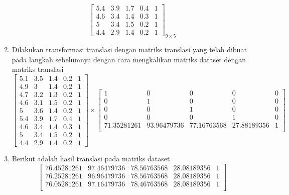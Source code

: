 \begin{enumerate}
\[\begin{bmatrix}
            5.4		&		3.9		&		1.7		&		0.4		&		1 \\
            4.6		&		3.4		&		1.4		&		0.3		&		1 \\
            5		&		3.4		&		1.5		&		0.2		&		1 \\
            4.4		&		2.9		&		1.4		&		0.2		&		1
        \end{bmatrix}_{9\times 5}
    \]
    \item Dilakukan transformasi translasi dengan matriks translasi yang telah dibuat pada langkah sebelumnya dengan cara mengkalikan matriks dataset dengan matriks translasi
    \[
        \begin{bmatrix}
            5.1		&		3.5		&		1.4		&		0.2		&		1 \\
            4.9		&		3		&		1.4		&		0.2		&		1 \\
            4.7		&		3.2		&		1.3		&		0.2		&		1 \\
            4.6		&		3.1		&		1.5		&		0.2		&		1 \\
            5		&		3.6		&		1.4		&		0.2		&		1 \\
            5.4		&		3.9		&		1.7		&		0.4		&		1 \\
            4.6		&		3.4		&		1.4		&		0.3		&		1 \\
            5		&		3.4		&		1.5		&		0.2		&		1 \\
            4.4		&		2.9		&		1.4		&		0.2		&		1
        \end{bmatrix} 
        \times
        \begin{bmatrix}
            1				&		0				&		0				&		0				&		0 \\
            0				&		1				&		0				&		0				&		0 \\
            0				&		0				&		1				&		0				&		0 \\
            0				&		0				&		0				&		1				&		0 \\
            71.35281261		&		93.96479736		&		77.16763568		&		27.88189356		&		1 \\
        \end{bmatrix} 
    \]
    \item Berikut adalah hasil translasi pada matriks dataset
    \[
        \begin{bmatrix}
            76.45281261  & 97.46479736 &  78.56763568 &  28.08189356 & 1 \\
            76.25281261  & 96.96479736 &  78.56763568 &  28.08189356 & 1 \\
            76.05281261  & 97.16479736 &  78.46763568 &  28.08189356 & 1 \\

\end{bmatrix}\]
\end{enumerate}
